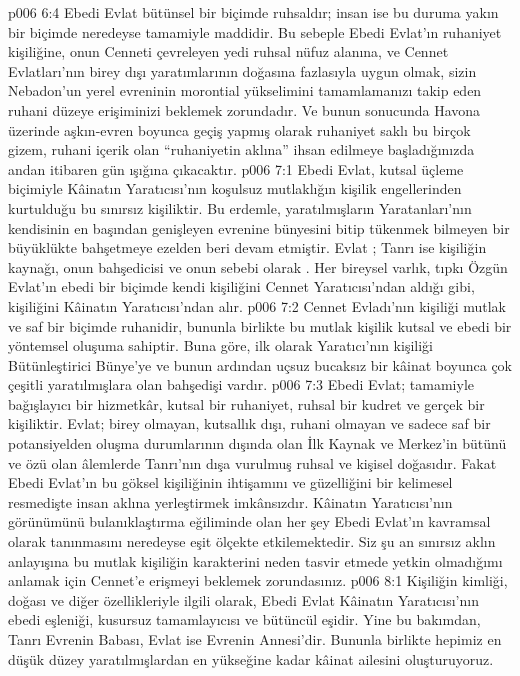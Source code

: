 \vs p006 6:4 Ebedi Evlat bütünsel bir biçimde ruhsaldır; insan ise bu duruma yakın bir biçimde neredeyse tamamiyle maddidir. Bu sebeple Ebedi Evlat’ın ruhaniyet kişiliğine, onun Cenneti çevreleyen yedi ruhsal nüfuz alanına, ve Cennet Evlatları’nın birey dışı yaratımlarının doğasına fazlasıyla uygun olmak, sizin Nebadon’un yerel evreninin morontial yükselimini tamamlamanızı takip eden ruhani düzeye erişiminizi beklemek zorundadır. Ve bunun sonucunda Havona üzerinde aşkın\hyp{}evren boyunca geçiş yapmış olarak ruhaniyet saklı bu birçok gizem, ruhani içerik olan “ruhaniyetin aklına” ihsan edilmeye başladığınızda andan itibaren gün ışığına çıkacaktır.
\vs p006 7:1 Ebedi Evlat, kutsal üçleme biçimiyle Kâinatın Yaratıcısı’nın koşulsuz mutlaklığın kişilik engellerinden kurtulduğu bu sınırsız kişiliktir. Bu erdemle, yaratılmışların Yaratanları’nın kendisinin en başından genişleyen evrenine bünyesini bitip tükenmek bilmeyen bir büyüklükte bahşetmeye ezelden beri devam etmiştir. Evlat ; Tanrı ise kişiliğin kaynağı, onun bahşedicisi ve onun sebebi olarak . Her bireysel varlık, tıpkı Özgün Evlat’ın ebedi bir biçimde kendi kişiliğini Cennet Yaratıcısı’ndan aldığı gibi, kişiliğini Kâinatın Yaratıcısı’ndan alır.
\vs p006 7:2 Cennet Evladı’nın kişiliği mutlak ve saf bir biçimde ruhanidir, bununla birlikte bu mutlak kişilik kutsal ve ebedi bir yöntemsel oluşuma sahiptir. Buna göre, ilk olarak Yaratıcı’nın kişiliği Bütünleştirici Bünye’ye ve bunun ardından uçsuz bucaksız bir kâinat boyunca çok çeşitli yaratılmışlara olan bahşedişi vardır.
\vs p006 7:3 Ebedi Evlat; tamamiyle bağışlayıcı bir hizmetkâr, kutsal bir ruhaniyet, ruhsal bir kudret ve gerçek bir kişiliktir. Evlat; birey olmayan, kutsallık dışı, ruhani olmayan ve sadece saf bir potansiyelden oluşma durumlarının dışında olan İlk Kaynak ve Merkez’in bütünü ve özü olan âlemlerde Tanrı’nın dışa vurulmuş ruhsal ve kişisel doğasıdır. Fakat Ebedi Evlat’ın bu göksel kişiliğinin ihtişamını ve güzelliğini bir kelimesel resmedişte insan aklına yerleştirmek imkânsızdır. Kâinatın Yaratıcısı’nın görünümünü bulanıklaştırma eğiliminde olan her şey Ebedi Evlat’ın kavramsal olarak tanınmasını neredeyse eşit ölçekte etkilemektedir. Siz şu an sınırsız aklın anlayışına bu mutlak kişiliğin karakterini neden tasvir etmede yetkin olmadığımı anlamak için Cennet’e erişmeyi beklemek zorundasınız.
\vs p006 8:1 Kişiliğin kimliği, doğası ve diğer özellikleriyle ilgili olarak, Ebedi Evlat Kâinatın Yaratıcısı’nın ebedi eşleniği, kusursuz tamamlayıcısı ve bütüncül eşidir. Yine bu bakımdan, Tanrı Evrenin Babası, Evlat ise Evrenin Annesi’dir. Bununla birlikte hepimiz en düşük düzey yaratılmışlardan en yükseğine kadar kâinat ailesini oluşturuyoruz.
